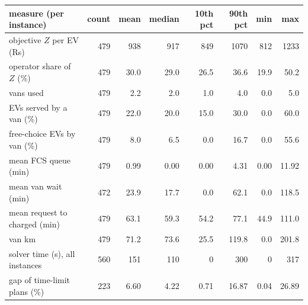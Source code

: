 \begin{tabular}{@{}lrrrrrrr@{}}
\toprule
measure (per instance) & count & mean & median & 10th pct & 90th pct & min & max \\
\midrule
objective $Z$ per EV (Rs) & 479 & 938 & 917 & 849 & 1070 & 812 & 1233 \\
operator share of $Z$ (\%) & 479 & 30.0 & 29.0 & 26.5 & 36.6 & 19.9 & 50.2 \\
vans used & 479 & 2.2 & 2.0 & 1.0 & 4.0 & 0.0 & 5.0 \\
EVs served by a van (\%) & 479 & 22.0 & 20.0 & 15.0 & 30.0 & 0.0 & 60.0 \\
free-choice EVs by van (\%) & 479 & 8.0 & 6.5 & 0.0 & 16.7 & 0.0 & 55.6 \\
mean FCS queue (min) & 479 & 0.99 & 0.00 & 0.00 & 4.31 & 0.00 & 11.92 \\
mean van wait (min) & 472 & 23.9 & 17.7 & 0.0 & 62.1 & 0.0 & 118.5 \\
mean request to charged (min) & 479 & 63.1 & 59.3 & 54.2 & 77.1 & 44.9 & 111.0 \\
van km & 479 & 71.2 & 73.6 & 25.5 & 119.8 & 0.0 & 201.8 \\
solver time (s), all instances & 560 & 151 & 110 & 0 & 300 & 0 & 317 \\
gap of time-limit plans (\%) & 223 & 6.60 & 4.22 & 0.71 & 16.87 & 0.04 & 26.89 \\
\bottomrule
\end{tabular}
